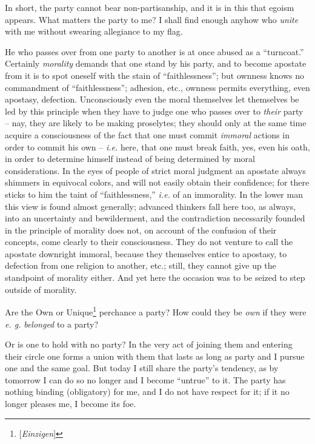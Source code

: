 \documentclass[12pt,a4paper]{book}
\begin{document}
In short, the party cannot bear non-partisanship, and it is in this that 
egoism appears. What matters the party to me? I shall find enough anyhow who 
\textit{unite} with me without swearing allegiance to my flag.

He who passes over from one party to another is at once abused as a 
``turncoat.'' Certainly \textit{morality} demands that one stand by his 
party, and to become apostate from it is to spot oneself with the stain of 
``faithlessness''; but ownness knows no commandment of ``faithlessness''; 
adhesion, etc., ownness permits everything, even apostasy, defection. 
Unconsciously even the moral themselves let themselves be led by this 
principle when they have to judge one who passes over to \textit{their} party 
-- nay, they are likely to be making proselytes; they should only at the same 
time acquire a consciousness of the fact that one must commit \textit{immoral} 
actions in order to commit his own -- \textit{i.e.} here, that one must break 
faith, yes, even his oath, in order to determine himself instead of being 
determined by moral considerations. In the eyes of people of strict moral 
judgment an apostate always shimmers in equivocal colors, and will not easily 
obtain their confidence; for there sticks to him the taint of 
``faithlessness,'' \textit{i.e.} of an immorality. In the lower man this 
view is found almost generally; advanced thinkers fall here too, as always, 
into an uncertainty and bewilderment, and the contradiction necessarily 
founded in the principle of morality does not, on account of the confusion of 
their concepts, come clearly to their consciousness. They do not venture to 
call the apostate downright immoral, because they themselves entice to 
apostasy, to defection from one religion to another, etc.; still, they cannot 
give up the standpoint of morality either. And yet here the occasion was to be 
seized to step outside of morality.

Are the Own or Unique\footnote{[\textit{Einzigen}]} perchance a party? How 
could they be \textit{own} if they were \textit{e. g.} \textit{belonged} to a 
party?

Or is one to hold with no party? In the very act of joining them and entering 
their circle one forms a union with them that lasts as long as party and I 
pursue one and the same goal. But today I still share the party's tendency, as 
by tomorrow I can do so no longer and I become ``untrue'' to it. The party 
has nothing binding (obligatory) for me, and I do not have respect for it; if 
it no longer pleases me, I become its foe.
\end{document}
